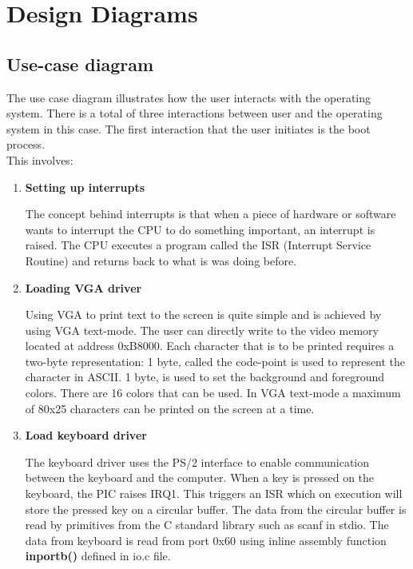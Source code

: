\graphicspath{ {./diagrams/} }
\chapter{Design Diagrams}\label{chapter:Design Diagrams}

\section{Use-case diagram}

\begin{flushleft}
	The use case diagram illustrates how the user interacts with the operating system. There is a total of three interactions between user and the operating system in this case.
	The first interaction that the user initiates is the boot process.\\ 
	This involves:
\end{flushleft}


\begin{enumerate}

	\item \textbf{Setting up interrupts}
	\begin{flushleft}
		The concept behind interrupts is that when a piece of hardware or software wants to
		interrupt the CPU to do something important, an interrupt is raised. The CPU
		executes a program called the ISR (Interrupt Service Routine) and returns back to
		what is was doing before.
	\end{flushleft}

	\item \textbf{Loading VGA driver}
	\begin{flushleft}
		Using VGA to print text to the screen is quite simple and is achieved by using
		VGA text-mode. The user can directly write to the video memory located at
		address 0xB8000. Each character that is to be printed requires a two-byte
		representation:
		1 byte, called the code-point is used to represent the character in ASCII.
		1 byte, is used to set the background and foreground colors. There are 16
		colors that can be used.
		In VGA text-mode a maximum of 80x25 characters can be printed on the
		screen at a time.
	\end{flushleft}

	\item \textbf{Load keyboard driver}
	\begin{flushleft}
		The keyboard driver uses the PS/2 interface to enable communication between the keyboard and the computer. When a key is pressed 
		on the keyboard, the PIC raises IRQ1. This triggers an ISR which on execution will store the pressed key on a circular buffer.
		The data from the circular buffer is read by primitives from the C standard library such as scanf in stdio. The data from keyboard is
		read from port 0x60 using inline assembly function \textbf{inportb()} defined in io.c file.
	\end{flushleft}
\end{enumerate}

